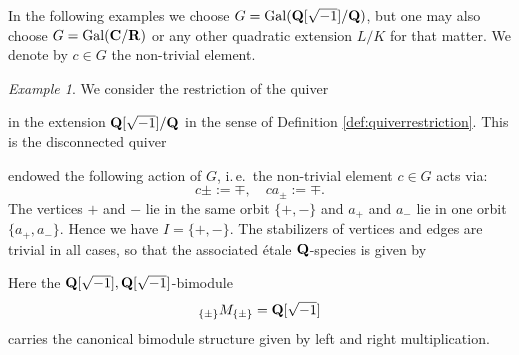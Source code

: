 \documentclass[a4paper,12pt,reqno]{amsart}
\newcommand{\CC}{{\rm\bf C}}
\newcommand{\RR}{{\rm\bf R}}
\newcommand{\QQ}{{\rm\bf Q}}
\DeclareMathOperator{\Gal}{\mathrm {Gal}}
\theoremstyle{plain}
\theoremstyle{remark}
\newtheorem{example}[theorem]{Example}
\begin{document}
    In the following examples we choose $G=\Gal(\QQ[\sqrt{-1}]/\QQ)$, but one may also choose $G=\Gal(\CC/\RR)$ or any other quadratic extension $L/K$ for that matter. We denote by $c\in G$ the non-trivial element.

    \begin{example}\label{ex:twoloops}
    We consider the restriction of the quiver
    \begin{center}
            \hspace*{2em}
    \end{center}
    in the extension $\QQ[\sqrt{-1}]/\QQ$ in the sense of Definition \ref{def:quiverrestriction}. This is the disconnected quiver 
    \begin{center}
            \hspace*{2em}
    \end{center}
    endowed the following action of $G$, i.\,e.\ the non-trivial element $c\in G$ acts via:
    \[
    c\pm :=\mp,\quad c a_\pm:=\mp.
    \]
    The vertices $+$ and $-$ lie in the same orbit $\{+,-\}$ and $a_+$ and $a_-$ lie in one orbit $\{a_+,a_-\}$. Hence we have $I=\{+,-\}$. The stabilizers of vertices and edges are trivial in all cases, so that the associated \'etale $\QQ$-species is given by
    \begin{center}
            \hspace*{2em}
    \end{center}
    Here the $\QQ[\sqrt{-1}],\QQ[\sqrt{-1}]$-bimodule
    \[
    {}_{\{\pm\}}M_{\{\pm\}}=\QQ[\sqrt{-1}]
    \]
    carries the canonical bimodule structure given by left and right multiplication.
    \end{example}
\end{document}

